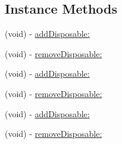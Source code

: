 \subsection*{Instance Methods}
\begin{DoxyCompactItemize}
\item 
(void) -\/ \mbox{\hyperlink{interface_r_a_c_compound_disposable_adfa5cef74d293abc13c6137289e6f908}{add\+Disposable\+:}}
\item 
(void) -\/ \mbox{\hyperlink{interface_r_a_c_compound_disposable_a8aabb5a290a10d14c6ca9c966701d1b3}{remove\+Disposable\+:}}
\item 
(void) -\/ \mbox{\hyperlink{interface_r_a_c_compound_disposable_adfa5cef74d293abc13c6137289e6f908}{add\+Disposable\+:}}
\item 
(void) -\/ \mbox{\hyperlink{interface_r_a_c_compound_disposable_a8aabb5a290a10d14c6ca9c966701d1b3}{remove\+Disposable\+:}}
\item 
(void) -\/ \mbox{\hyperlink{interface_r_a_c_compound_disposable_adfa5cef74d293abc13c6137289e6f908}{add\+Disposable\+:}}
\item 
(void) -\/ \mbox{\hyperlink{interface_r_a_c_compound_disposable_a8aabb5a290a10d14c6ca9c966701d1b3}{remove\+Disposable\+:}}
\end{DoxyCompactItemize}

